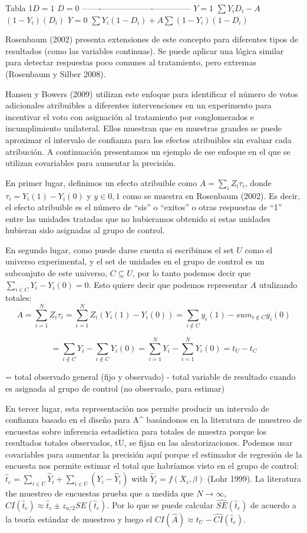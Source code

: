 \documentclass[
]{article}
\begin{document}
Tabla 1\textbar{}\(D=1\) \textbar{}\(D=0\)
-------\textbar-------------------\textbar-------------- \(Y=1\)
\textbar{}\(\sum Y_iD_i-A\) \textbar{}\((1-Y_i)(D_i)\) \(Y=0\)
\textbar{}\(\sum Y_i(1-D_i)+A\)\textbar{}\(\sum (1-Y_i)(1-D_i)\)

Rosenbaum (2002) presenta extensiones de este concepto para diferentes
tipos de resultados (como las variables continuas). Se puede aplicar una
lógica similar para detectar respuestas poco comunes al tratamiento,
pero extremas (Rosenbaum y Silber 2008).

Hansen y Bowers (2009) utilizan este enfoque para identificar el número
de votos adicionales atribuibles a diferentes intervenciones en un
experimento para incentivar el voto con asignación al tratamiento por
conglomerados e incumplimiento unilateral. Ellos muestran que en
muestras grandes se puede aproximar el intervalo de confianza para los
efectos atribuibles sin evaluar cada atribución. A continuación
presentamos un ejemplo de ese enfoque en el que se utilizan covariables
para aumentar la precisión.

En primer lugar, definimos un efecto atribuible como
\(A=\sum_iZ_i\tau_i\), donde \(\tau_i=Y_i(1)-Y_i(0)\) y \(y\in0,1\) como
se muestra en Rosenbaum (2002). Es decir, el efecto atribuible es el
número de ``sis'' o ``exitos'' o otras respuestas de ``1'' entre las
unidades tratadas que no hubieramos obtenido si estas unidades hubieran
sido asignadas al grupo de control.

En segundo lugar, como puede darse cuenta si escribimos el set \(U\)
como el universo experimental, y el set de unidades en el grupo de
control es un subconjuto de este universo, \(C\subseteq U\), por lo
tanto podemos decir que \(\sum_{i\in C}Y_i-Y_i(0)=0\). Esto quiere decir
que podemos representar \(A\) utulizando totales:
\[A = \sum_{i=1}^NZ_i\tau_i=\sum_{i=1}^NZ_i(Y_i(1)-Y_i(0))=\sum_{i\notin C}y_i(1)-sum_{i\notin C}y_i(0)\]

\[  = \sum_{i\notin C}Y_i-\sum_{i\notin C}Y_i(0)=\sum_{i=1}^NY_i-\sum_{i=1}^NY_i(0)=t_U-t_C\]

= total observado general (fijo y observado) - total variable de
resultado cuando es asignada al grupo de control (no observado, para
estimar)

En tercer lugar, esta representación nos permite producir un intervalo
de confianza basado en el diseño para A\^{} basándonos en la literatura
de muestreo de encuestas sobre inferencia estadística para totales de
muestra porque los resultados totales observados, tU, se fijan en las
aleatorizaciones. Podemos usar covariables para aumentar la precisión
aquí porque el estimador de regresión de la encuesta nos permite estimar
el total que habríamos visto en el grupo de control:
\(\hat{t}_c=\sum_{i\in U}\hat{Y}_i+\sum_{i\in U}(Y_i-\hat{Y}_i)\) with
\(\hat{Y}_i=f(X_i,\beta)\) (Lohr 1999). La literatura the muestreo de
encuestas prueba que a medida que \(N\rightarrow \infty\),
\(CI(\hat{t}_c) \approx \hat{t}_c \pm z_{a/2}SE(\hat{t}_c)\). Por lo que
se puede calcular \(\widehat{SE}(\hat{t}_c)\) de acuerdo a la teoría
estándar de muestreo y luego el
\(CI(\hat{A}) \approx t_U-\widehat{CI}(\hat{t}_c)\).
\end{document}
